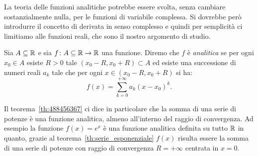 La teoria delle funzioni analitiche potrebbe essere svolta, senza cambiare
sostanzialmente nulla, per le funzioni di variabile complessa.
Si dovrebbe però introdurre il concetto di derivata in senso complesso
e quindi per semplicità ci limitiamo alle funzioni reali, 
che sono il nostro argomento di studio.

\begin{definition}
%
Sia $A\subseteq {\mathbb R}$ e sia $f\colon A\subseteq {\mathbb R} \to {\mathbb R}$ una funzione. 
Diremo che
$f$ è \emph{analitica} se per ogni $x_0\in A$ esiste $R>0$ 
tale $(x_0-R,x_0+R)\subset A$ ed esiste una successione
di numeri reali $a_k$ tale che per ogni 
$x\in (x_0-R,x_0+R)$ si ha:
\[
  f(x) = \sum_{k=0}^{+\infty} a_k (x-x_0)^k.
\]
\end{definition}

Il teorema~\ref{th:488456367} ci dice in particolare che la somma di una serie
di potenze è una funzione analitica, almeno all'interno del raggio di convergenza.
Ad esempio la funzione $f(x)=e^x$ è una funzione 
analitica definita su tutto ${\mathbb R}$ in quanto, 
grazie al teorema~\ref{th:serie_esponenziale} 
$f(x)$ risulta essere la somma di una serie di potenze
con raggio di convergenza $R=+\infty$ centrata in $x=0$.

